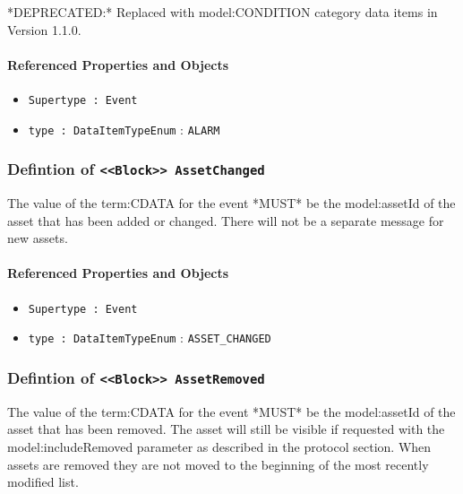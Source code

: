 \FloatBarrier

*DEPRECATED:* Replaced with {model:CONDITION} category data items in Version 1.1.0.

\FloatBarrier
\paragraph{Referenced Properties and Objects}

\begin{itemize}
\item \texttt{Supertype : Event}

\item \texttt{type : DataItemTypeEnum} : \texttt{ALARM}

\end{itemize}
\FloatBarrier
\subsubsection{Defintion of \texttt{<<Block>> AssetChanged}}
  \label{type:AssetChanged}

\FloatBarrier

The value of the {term:CDATA} for the event *MUST* be the {model:assetId} of the asset that has been added or changed. There will not be a separate message for new assets.

\FloatBarrier
\paragraph{Referenced Properties and Objects}

\begin{itemize}
\item \texttt{Supertype : Event}

\item \texttt{type : DataItemTypeEnum} : \texttt{ASSET_CHANGED}

\end{itemize}
\FloatBarrier
\subsubsection{Defintion of \texttt{<<Block>> AssetRemoved}}
  \label{type:AssetRemoved}

\FloatBarrier

The value of the {term:CDATA} for the event *MUST* be the {model:assetId} of the asset that has been removed. The asset will still be visible if requested with the {model:includeRemoved} parameter as described in the protocol section. When assets are removed they are not moved to the beginning of the most recently modified list.

